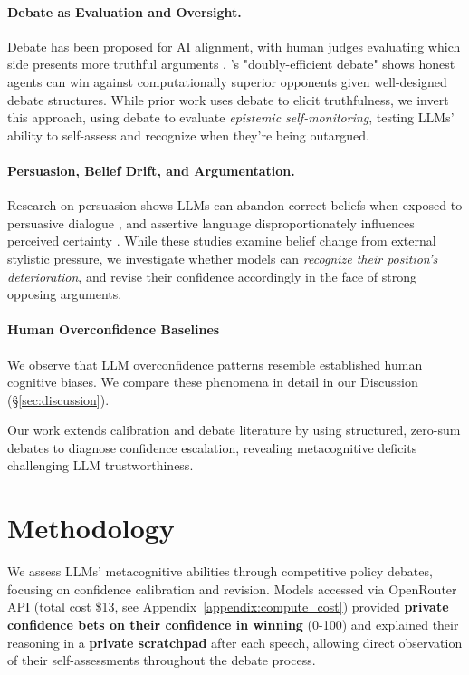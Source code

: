 \documentclass{article}
\begin{document}
\paragraph{Debate as Evaluation and Oversight.}
Debate has been proposed for AI alignment, with human judges evaluating which side presents more truthful arguments \citep{irving2018debate}. \citet{browncohen2023debate}'s "doubly-efficient debate" shows honest agents can win against computationally superior opponents given well-designed debate structures. While prior work uses debate to elicit truthfulness, we invert this approach, using debate to evaluate \textit{epistemic self-monitoring}, testing LLMs' ability to self-assess and recognize when they're being outargued.

\paragraph{Persuasion, Belief Drift, and Argumentation.}
Research on persuasion shows LLMs can abandon correct beliefs when exposed to persuasive dialogue \citep{xu2023earthflat}, and assertive language disproportionately influences perceived certainty \citep{zhou2023epistemic,rivera2023assertive,agarwal2025persuasionoverridestruthmultiagent}. While these studies examine belief change from external stylistic pressure, we investigate whether models can \textit{recognize their position's deterioration}, and revise their confidence accordingly in the face of strong opposing arguments.

\paragraph{Human Overconfidence Baselines}
We observe that LLM overconfidence patterns resemble established human cognitive biases. We compare these phenomena in detail in our Discussion (\S\ref{sec:discussion}).

Our work extends calibration and debate literature by using structured, zero-sum debates to diagnose confidence escalation, revealing metacognitive deficits challenging LLM trustworthiness.

\section{Methodology}
\label{sec:methodology}

We assess LLMs' metacognitive abilities through competitive policy debates, focusing on confidence calibration and revision. Models accessed via OpenRouter API (total cost \$13, see Appendix~\ref{appendix:compute_cost}) provided \textbf{private confidence bets on their confidence in winning} (0-100) and explained their reasoning in a \textbf{private scratchpad} after each speech, allowing direct observation of their self-assessments throughout the debate process.
\end{document}
